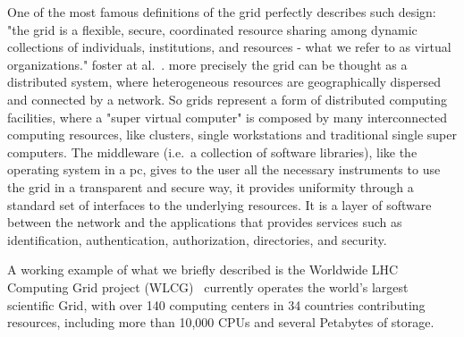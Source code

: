 One of the most famous
definitions of the grid perfectly describes such design: "the grid is a
flexible, secure, coordinated resource sharing among dynamic collections
of individuals, institutions, and resources - what we refer to as
virtual organizations." foster at al.~\cite{anatomy_grid}. 
more precisely the grid can be thought as a distributed system, where 
heterogeneous resources are geographically dispersed and connected by a network.
So grids represent a form of distributed computing facilities, where a 
"super virtual computer" is composed by many interconnected computing resources,
like clusters, single workstations and traditional single super computers.
The middleware (i.e.\ a collection of software libraries), like the operating system in a pc, gives to the user all
the necessary instruments to use the grid in a transparent and secure
way, it provides uniformity through a standard set of interfaces to the
underlying resources. It is a layer of software between the network and
the applications that provides services such as identification,
authentication, authorization, directories, and security. 

A working example of what we briefly described is the Worldwide LHC Computing Grid project (WLCG)~\cite{lcgwebsite}
currently operates the world's largest scientific Grid, with over 
140 computing centers in 34 countries contributing
resources, including more than 10,000 CPUs and several Petabytes of storage. 



